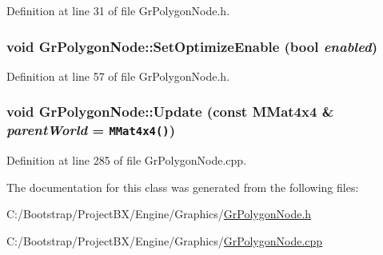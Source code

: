 Definition at line 31 of file GrPolygonNode.h.\hypertarget{class_gr_polygon_node_df9325ab5b72b5a3723e921c2c0d22f0}{
\subsubsection[{SetOptimizeEnable}]{\setlength{\rightskip}{0pt plus 5cm}void GrPolygonNode::SetOptimizeEnable (bool {\em enabled})}}
\label{class_gr_polygon_node_df9325ab5b72b5a3723e921c2c0d22f0}




Definition at line 57 of file GrPolygonNode.h.\hypertarget{class_gr_polygon_node_bbc436bb38dbce862723044ca910b08a}{
\subsubsection[{Update}]{\setlength{\rightskip}{0pt plus 5cm}void GrPolygonNode::Update (const {\bf MMat4x4} \& {\em parentWorld} = {\tt {\bf MMat4x4}()})}}
\label{class_gr_polygon_node_bbc436bb38dbce862723044ca910b08a}




Definition at line 285 of file GrPolygonNode.cpp.

The documentation for this class was generated from the following files:\begin{CompactItemize}
\item 
C:/Bootstrap/ProjectBX/Engine/Graphics/\hyperlink{_gr_polygon_node_8h}{GrPolygonNode.h}\item 
C:/Bootstrap/ProjectBX/Engine/Graphics/\hyperlink{_gr_polygon_node_8cpp}{GrPolygonNode.cpp}\end{CompactItemize}
